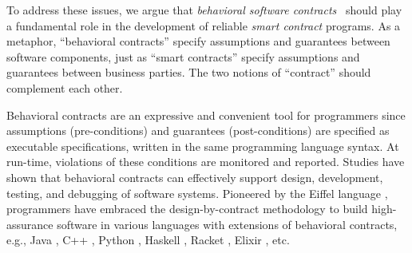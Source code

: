 To address these issues, we argue that \emph{behavioral software
contracts}~\cite{DBLP:conf/tools/Meyer98a} should play a fundamental role in
the development of reliable \emph{smart contract} programs.
As a metaphor, ``behavioral contracts'' specify assumptions and guarantees 
between software components, just as ``smart contracts'' specify assumptions and guarantees 
between business parties.
The two notions of ``contract'' should complement each other.

Behavioral contracts are an expressive and convenient tool for programmers since assumptions (pre-conditions) and guarantees (post-conditions)
are specified as executable specifications, written in the same programming language syntax.
At run-time, violations of these conditions are monitored and reported.
Studies \cite{DBLP:conf/rodin/Chalin06, DBLP:books/ph/Meyer97}
have shown that behavioral contracts can effectively support design, development,
testing, and debugging of software systems.
Pioneered by the Eiffel language \cite{DBLP:books/ph/Meyer91},
programmers have embraced the design-by-contract methodology \cite{DBLP:conf/tools/Meyer98a,
DBLP:books/ph/Meyer97} to build high-assurance software in various languages 
with extensions of behavioral contracts,
e.g., Java \cite{DBLP:journals/sttt/BurdyCCEKLLP05},
C++ \cite{boost_contract},
Python \cite{icontract},
Haskell \cite{DBLP:conf/popl/XuJC09},
Racket \cite{DBLP:conf/icfp/FindlerF02},
Elixir \cite{DBLP:conf/erlang/0001BBHMEF22}, etc. 

